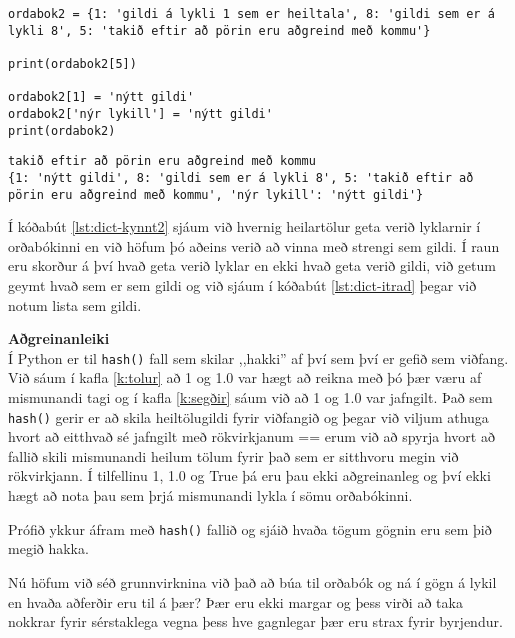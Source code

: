 \begin{lstlisting}[caption=Gögnum bætt við og þau tekin út, label=lst:dict-kynnt2]
ordabok2 = {1: 'gildi á lykli 1 sem er heiltala', 8: 'gildi sem er á lykli 8', 5: 'takið eftir að pörin eru aðgreind með kommu'}

print(ordabok2[5])

ordabok2[1] = 'nýtt gildi' 
ordabok2['nýr lykill'] = 'nýtt gildi'
print(ordabok2)
\end{lstlisting}
\lstset{style=uttak}
\begin{lstlisting}
takið eftir að pörin eru aðgreind með kommu
{1: 'nýtt gildi', 8: 'gildi sem er á lykli 8', 5: 'takið eftir að pörin eru aðgreind með kommu', 'nýr lykill': 'nýtt gildi'}
\end{lstlisting}
\lstset{style=venjulegt}

Í kóðabút \ref{lst:dict-kynnt2} sjáum við hvernig heilartölur geta verið lyklarnir í orðabókinni en við höfum þó aðeins verið að vinna með strengi sem gildi.
Í raun eru skorður á því hvað geta verið lyklar en ekki hvað geta verið gildi, við getum geymt hvað sem er sem gildi og við sjáum í kóðabút \ref{lst:dict-itrad} þegar við notum lista sem gildi.

\begin{itarefni}
\textbf{Aðgreinanleiki}\\
Í Python er til \texttt{hash()} fall sem skilar ,,hakki'' af því sem því er gefið sem viðfang.
Við sáum í kafla \ref{k:tolur} að 1 og 1.0 var hægt að reikna með þó þær væru af mismunandi tagi og í kafla \ref{k:segðir} sáum við að 1 og 1.0 var jafngilt.
Það sem \texttt{hash()} gerir er að skila heiltölugildi fyrir viðfangið og þegar við viljum athuga hvort að eitthvað sé jafngilt með rökvirkjanum == erum við að spyrja hvort að fallið skili mismunandi heilum tölum fyrir það sem er sitthvoru megin við rökvirkjann.
Í tilfellinu 1, 1.0 og True þá eru þau ekki aðgreinanleg og því ekki hægt að nota þau sem þrjá mismunandi lykla í sömu orðabókinni.

Prófið ykkur áfram með \texttt{hash()} fallið og sjáið hvaða tögum gögnin eru sem þið megið hakka. 
\end{itarefni}

Nú höfum við séð grunnvirknina við það að búa til orðabók og ná í gögn á lykil en hvaða aðferðir eru til á þær?
Þær eru ekki margar og þess virði að taka nokkrar fyrir sérstaklega vegna þess hve gagnlegar þær eru strax fyrir byrjendur.

